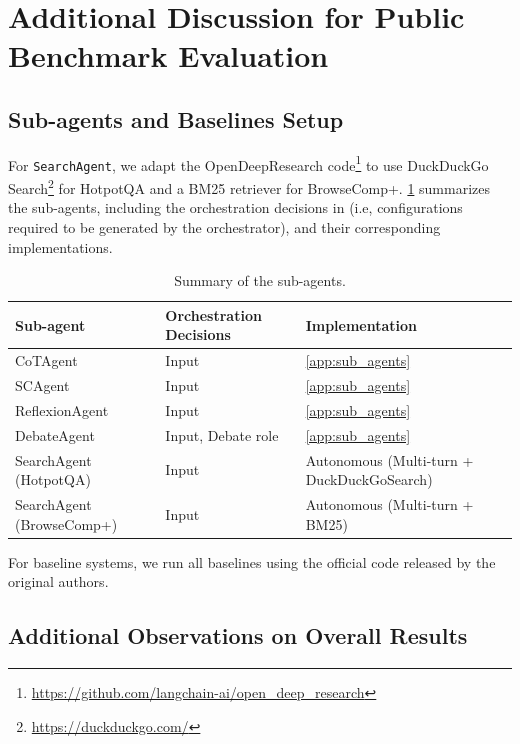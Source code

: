 \section{Additional Discussion for Public Benchmark Evaluation}
\label{ap:disucuss_public}


\subsection{Sub-agents and Baselines Setup}
\label{ap:discuss_baselines}

For \texttt{SearchAgent}, we adapt the OpenDeepResearch code\footnote{\url{https://github.com/langchain-ai/open_deep_research}}
 to use DuckDuckGo Search\footnote{\url{https://duckduckgo.com/}}
 for HotpotQA and a BM25 retriever \citep{robertson1994okapi} for BrowseComp+. \cref{tab:baseline_setup} summarizes the sub-agents, including the orchestration decisions in \ourframework (i.e, configurations required to be generated by the orchestrator), and their corresponding implementations.

\begin{table}[h]
\centering
\small
\begin{tabular}{l l l}
\toprule
\textbf{Sub-agent} & \textbf{Orchestration Decisions} & \textbf{Implementation} \\
\midrule
CoTAgent & Input & \cref{app:sub_agents} \\
SCAgent & Input & \cref{app:sub_agents} \\
ReflexionAgent & Input & \cref{app:sub_agents} \\
DebateAgent & Input, Debate role & \cref{app:sub_agents} \\
SearchAgent (HotpotQA) & Input & Autonomous (Multi-turn + DuckDuckGoSearch) \\
SearchAgent (BrowseComp+) & Input & Autonomous (Multi-turn + BM25) \\
\bottomrule
\end{tabular}
\caption{Summary of the sub-agents.
}
\label{tab:baseline_setup}
\end{table}

For baseline systems, we run all baselines using the official code released by the original authors.

\subsection{Additional Observations on Overall Results}
\label{ap:addition_observation}


